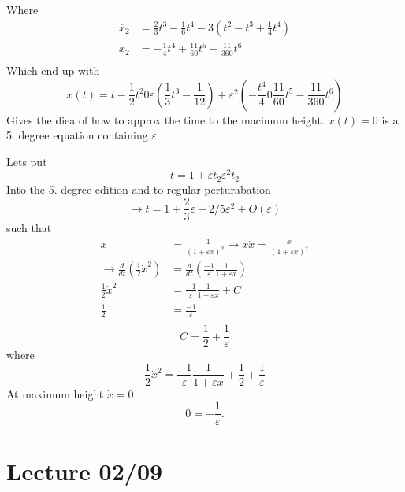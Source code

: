 \documentclass{article}
\theoremstyle{remark}
\newcommand{\newpara}
  {
  \vskip 0.4cm
  }
\begin{document}
Where \[
  \begin{split}
\ddot{x_{2}} &=   \frac{2}{3} t^3 - \frac{1}{6} t ^{4} - 3 \left(t ^2 - t ^3 +  \frac{1}{4} t ^{4}  \right) \\
x_{2} &=  -\frac{1}{4} t ^{4} + \frac{11}{60} t^{5} - \frac{11}{360 } t ^{6} \\
  \end{split} 
\] 
Which end up with \[
x\left( t \right) = t -\frac{1}{2} t^{2} 0 \varepsilon  \left( \frac{1}{3} t^3 - \frac{1}{12} \right) + \varepsilon ^2 \left( - \frac{t ^{4}}{4}  0 \frac{11}{60} t ^{5} - \frac{11}{360 } t ^{ 6} \right)
\] 
Gives the diea of how to approx the time to the macimum height. $\dot{x}\left( t \right) = 0$ is a 5. degree equation containing $\varepsilon $ . 

\newpara
Lets put \[
t = 1+ \varepsilon  t_{2}  \varepsilon ^2 t_{2}
\] 
Into the 5. degree edition and to regular perturabation \[
\to  t =  1 + \frac{2}{3} \varepsilon  + 2 /5 \varepsilon ^2 + O\left( \varepsilon  \right)
\]  
such that \[
  \begin{split}
\ddot{x}  &=  \frac{-1}{ \left(  1+ \varepsilon  x \right)^2 }  \to  \ddot{x} \dot{x} = \frac{\dot{x}}{\left( 1+ \varepsilon  x \right)^2}  \\
\to  \frac{d }{d t}  \left( \frac{1}{2} \dot{x}^2 \right) &=  \frac{d }{d t} \left( \frac{-1}{\varepsilon }  \frac{1}{ 1+ \varepsilon  x}  \right)  \\
\frac{1}{2}  \dot{x}^2 &=  \frac{-1}{\varepsilon }  \frac{1}{ 1+ \varepsilon x}  + C  \\
\frac{1}{2} &=  \frac{-1}{\varepsilon }   \\
  \end{split} 
\] 
\[
C = \frac{1}{2} + \frac{1}{\varepsilon }
\] 
where \[
\frac{1}{2} \dot{x}^2 = \frac{-1}{\varepsilon }  \frac{1}{1+ \varepsilon  x}  + \frac{1}{2} + \frac{1}{\varepsilon }
\]  
At maximum height $\dot{x} = 0$
\[
 0 = -\frac{1}{\varepsilon } .
\] 


\newpage
\section{Lecture 02/09}%
\label{sec:lecture_02_09}
\end{document}
